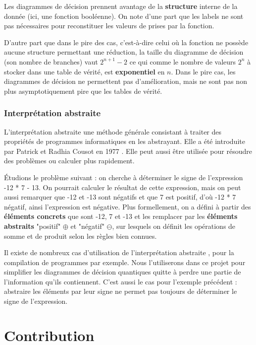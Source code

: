 Les diagrammes de décision prennent avantage de la \textbf{structure} interne de la donnée (ici, une fonction booléenne). On note d'une part que les labels ne sont pas nécessaires pour reconstituer les valeurs de prises par la fonction.

D'autre part que dans le pire des cas, c'est-à-dire celui où la fonction ne possède aucune structure permettant une réduction, la taille du diagramme de décision (son nombre de branches) vaut $2^{n+1} - 2$ ce qui comme le nombre de valeurs $2^n$ à stocker dans une table de vérité, est \textbf{exponentiel} en $n$. Dans le pire cas, les diagrammes de décision ne permettent pas d'amélioration, mais ne sont pas non plus asymptotiquement pire que les tables de vérité.

\subsubsection*{Interprétation abstraite}


L'interprétation abstraite une méthode générale consistant à traiter des propriétés de programmes informatiques en les abstrayant. Elle a été introduite par Patrick et Radhia Cousot en 1977 \cite{CousotCousot77-1}. Elle peut aussi être utilisée pour résoudre des problèmes ou calculer plus rapidement.

Étudions le problème suivant : on cherche à déterminer le signe de  l'expression -12 * 7 - 13. On pourrait calculer le résultat de cette expression, mais on peut aussi remarquer que -12 et -13 sont négatifs et que 7 est positif, d'où -12 * 7 négatif, ainsi l'expression est négative. Plus formellement, on a défini à partir des \textbf{éléments concrets} que sont -12, 7 et -13 et les remplacer par les \textbf{éléments abstraits} "positif" $\oplus$ et "négatif" $\ominus$, sur lesquels on définit les opérations de somme et de produit selon les règles bien connues.

Il existe de nombreux cas d'utilisation de l'interprétation abstraite \cite{Rosendahl_1995}, pour la compilation de programmes par exemple. Nous l'utiliserons dans ce projet pour simplifier les diagrammes de décision quantiques quitte à perdre une partie de l'information qu'ils contiennent. C'est aussi le cas pour l'exemple précédent : abstraire les éléments par leur signe ne permet pas toujours de déterminer le signe de l'expression.


\section{Contribution}
\label{sec:Contribution}

